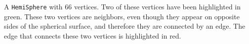 \label{fig:hemiSphere} A \verb|HemiSphere| with 66 vertices. Two of these vertices have been highlighted in green. These two vertices are neighbors, even though they appear on opposite sides of the spherical surface, and therefore they are connected by an edge. The edge that connects these two vertices is highlighted in red.